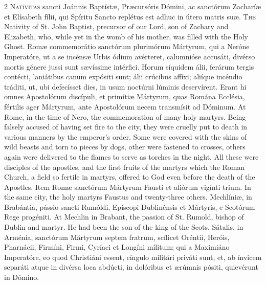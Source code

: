\begin{paracol}{2}
\lettrine[lines=2]{N}{atívitas} sancti 
 Joánnis Baptístæ, Præcursóris Dómini, ac sanctórum Zacharíæ et Elísabeth fílii, qui Spíritu Sancto replétus est adhuc in útero matris suæ.
\switchcolumn
{}
\lettrine[lines=2]{T}{he} Nativity of St. John Baptist, 
 precursor of our Lord, son of Zachary and Elizabeth, who, while yet in the 
 womb of his mother, was filled with the Holy Ghost.
\switchcolumn*
{}
Romæ commemorátio 
 sanctórum plurimórum Mártyrum, qui a Neróne Imperatóre, ut a se incénsæ 
 Urbis ódium avérteret, calumnióse accusáti, divérso mortis génere jussi sunt 
 sævíssime intérfici. Horum síquidem álii, ferárum tergis contécti, 
 laniátibus canum expósiti sunt; álii crúcibus affíxi; aliíque incéndio 
 tráditi, ut, ubi defecísset dies, in usum noctúrni lúminis deservírent. 
 Erant hi omnes Apostolórum discípuli, et primítiæ Mártyrum, quas Romána 
 Ecclésia, fértilis ager Mártyrum, ante Apostolórum necem transmísit ad 
 Dóminum.
\switchcolumn
{}
At Rome, in the time of Nero, the 
 commemoration of many holy martyrs. Being falsely accused of having 
 set fire to the city, they were cruelly put to death in various manners by 
 the emperor's order. Some were covered with the skins of wild beasts 
 and torn to pieces by dogs, other were fastened to crosses, others again 
 were delivered to the flames to serve as torches in the night. All 
 these were disciples of the apostles, and the first fruits of the martyrs 
 which the Roman Church, a field so fertile in martyrs, offered to God even 
 before the death of the Apostles.
\switchcolumn*
{}
Item Romæ sanctórum 
 Mártyrum Fausti et aliórum vigínti trium.
\switchcolumn
{}
In the same city, the holy martyrs 
 Faustus and twenty-three others.
\switchcolumn*
{}
Mechlíniæ, in Brabántia, 
 pássio sancti Rumóldi, Epíscopi Dublinénsis et Mártyris, e Scotórum Rege 
 progéniti.
\switchcolumn
{}
At Mechlin in Brabant, the passion 
 of St. Rumold, bishop of Dublin and martyr. He had been the son of the 
 king of the Scots.
\switchcolumn*
{}
Sátalis, in Arménia, sanctórum Mártyrum septem fratrum, scílicet Oréntii, Heróis, Pharnácii, 
 Firmíni, Firmi, Cyríaci et Longíni mílitum; qui a Maximiáno Imperatóre, eo 
 quod Christiáni essent, cíngulo militári priváti sunt, et, ab ínvicem 
 separáti atque in divérsa loca abdúcti, in dolóribus et ærúmnis pósiti, 
 quievérunt in Dómino.

\end{paracol}
